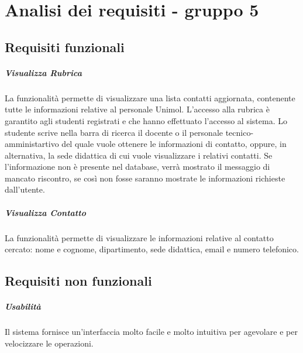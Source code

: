 
\chapter{Analisi dei requisiti - gruppo 5}
\label{ref:requisiti5}


\section{Requisiti funzionali}

\paragraph{Visualizza Rubrica \\} 
La funzionalità permette di visualizzare una lista contatti aggiornata, contenente tutte le informazioni relative al personale Unimol. L’accesso alla rubrica è garantito agli studenti
registrati e che hanno effettuato l'accesso al sistema.
Lo studente scrive nella barra di ricerca il docente o il personale tecnico-amministartivo del quale vuole ottenere le informazioni di contatto, oppure, in alternativa, la sede didattica di cui vuole visualizzare i relativi contatti.
Se l'informazione non è presente nel database, verrà mostrato
il messaggio di mancato riscontro, se così non fosse saranno
mostrate le informazioni richieste dall'utente.

\paragraph{Visualizza Contatto \\}
La funzionalità permette di visualizzare le informazioni relative al contatto cercato: nome e cognome, dipartimento, sede didattica, email e numero telefonico.

\section{Requisiti non funzionali}

\paragraph{Usabilità \\} 
Il sistema fornisce un’interfaccia molto facile e molto intuitiva per agevolare e per velocizzare le operazioni.

